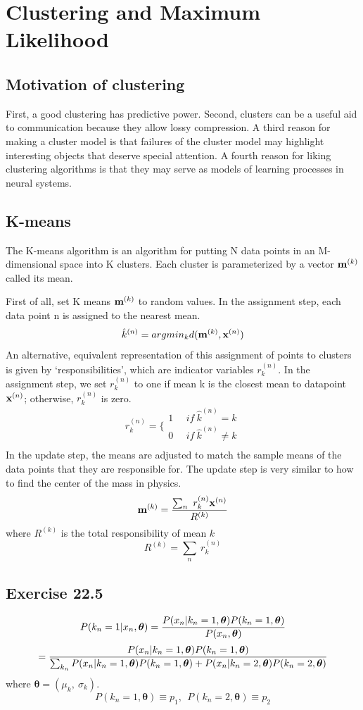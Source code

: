\documentclass[a4paper,11pt]{article}
\newcommand{\vect}[1]{\boldsymbol{\mathbf{#1}}}
\numberwithin{equation}{section}
\begin{document}
{\section{Clustering and Maximum Likelihood}
\subsection{Motivation of clustering}
First, a good clustering has
predictive power. Second, clusters can be a useful aid to communication because they allow
lossy compression. A third reason for making a cluster model is that failures of the cluster
model may highlight interesting objects that deserve special attention. A fourth reason for liking clustering algorithms is that they may serve
as models of learning processes in neural systems.

\subsection{K-means}
The K-means algorithm is an algorithm for putting N data points in an M-dimensional space into K clusters. Each cluster is parameterized by a vector
${\textbf m}^{(k)}$ called its mean. 

First of all, set K means {${\textbf m}^{(k)}$} to random values. In the assignment step, each data point n is
assigned to the nearest mean. 
$$
\hat k^{(n)} = argmin_k d({\textbf m}^{(k)}, {\textbf x}^{(n)})
$$
An alternative, equivalent representation of this assignment of
points to clusters is given by `responsibilities', which are indicator
variables $r^{(n)}_k$. In the assignment step, we set $r^{(n)}_k$ to one if mean k is the closest mean to datapoint $ {\textbf x}^{(n)}$; otherwise, $r^{(n)}_k$ is zero.
$$
r^{(n)}_k = \{
\begin{array}{cc}
1 ~~~~~~if ~\hat k^{(n)}=k\\
0 ~~~~~~if ~\hat k^{(n)}\ne k\\
\end{array}
$$
In the update step, the means are adjusted to
match the sample means of the data points that they are responsible for. The update step is very similar to how to find the center of the mass in physics. 
$$
{\textbf m}^{(k)}= {\sum_n ~ r^{(n)}_k {\textbf x}^{(n)} \over R^{(k)}}
$$
where $R^{(k)}$ is the total responsibility of mean $k$
$$
R^{(k)}=\sum_n~r^{(n)}_k
$$




\subsection{Exercise 22.5}
$$
P(k_n = 1|x_n, \vect{\theta})= {P(x_n|k_n=1,\vect{\theta})P(k_n=1,\vect{\theta}) \over P(x_n,\vect{\theta})}
$$
$$
= {P(x_n|k_n=1,\vect{\theta})P(k_n=1,\vect{\theta}) \over \sum_{k_n}  P(x_n|k_n=1,\vect{\theta})P(k_n=1,\vect{\theta}) +P(x_n|k_n=2,\vect{\theta})P(k_n=2,\vect{\theta}) }
$$
where $\vect{\theta}=(\mu_k, ~\sigma_k)$. 
$$
P(k_n=1,\vect{\theta}) \equiv p_1,~~P(k_n=2,\vect{\theta}) \equiv p_2
$$

}
\end{document}
